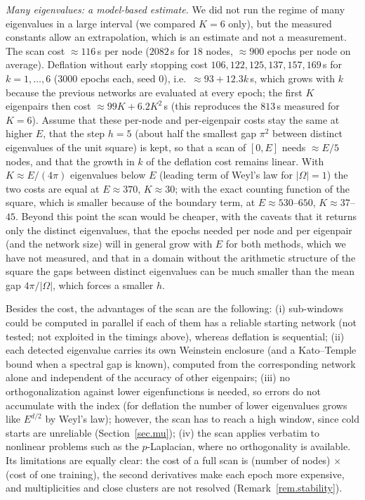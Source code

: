 \documentclass[10pt]{amsart}
\newenvironment{revblock}{\color{blue}}{}
\theoremstyle{definition}
\theoremstyle{remark}
\theoremstyle{plain}
\begin{document}
\begin{revblock}
\emph{Many eigenvalues: a model-based estimate.} We did not run the regime of many eigenvalues in a
large interval (we compared $K=6$ only), but the measured constants allow an extrapolation, which is an
estimate and not a measurement. The scan cost $\approx116$\,s per node ($2082$\,s for 18 nodes,
$\approx900$ epochs per node on average). Deflation without early stopping cost $106,122,125,137,157,169$\,s
for $k=1,\dots,6$ (3000 epochs each, seed 0), i.e.\ $\approx93+12.3k$\,s, which grows with $k$ because
the previous networks are evaluated at every epoch; the first $K$ eigenpairs then cost
$\approx99K+6.2K^2$\,s (this reproduces the $813$\,s measured for $K=6$). Assume that these per-node and
per-eigenpair costs stay the same at higher $E$, that the step $h=5$ (about half the smallest gap
$\pi^2$ between distinct eigenvalues of the unit square) is kept, so that a scan of $[0,E]$ needs
$\approx E/5$ nodes, and that the growth in $k$ of the deflation cost remains linear. With $K\approx
E/(4\pi)$ eigenvalues below $E$ (leading term of Weyl's law for $|\Omega|=1$) the two costs are equal at
$E\approx370$, $K\approx30$; with the exact counting function of the square, which is smaller because of
the boundary term, at $E\approx530$--$650$, $K\approx37$--$45$. Beyond this point the scan would be
cheaper, with the caveats that it returns only the distinct eigenvalues, that the epochs needed per
node and per eigenpair (and the network size) will in general grow with $E$ for both methods, which
we have not measured, and that in a domain without the arithmetic structure of the square the gaps
between distinct eigenvalues can be much smaller than the mean gap $4\pi/|\Omega|$, which forces a
smaller $h$.

Besides the cost, the advantages of the
scan are the following: (i) sub-windows could be computed in parallel if each of them has a reliable
starting network (not tested; not exploited in the timings above), whereas deflation is sequential;
(ii) each detected eigenvalue carries its own Weinstein enclosure (and a Kato--Temple bound when a
spectral gap is known), computed from the corresponding network alone and
independent of the accuracy of other eigenpairs; (iii) no orthogonalization against lower
eigenfunctions is needed, so errors do not accumulate with the index (for deflation the number of
lower eigenvalues grows like $E^{d/2}$ by Weyl's law); however, the scan has to reach a high window,
since cold starts are unreliable (Section~\ref{sec.mu}); (iv) the scan applies verbatim to nonlinear
problems such as the $p$-Laplacian, where no orthogonality is available. Its limitations are equally
clear: the cost of a full scan is (number of nodes) $\times$ (cost of one training), the second
derivatives make each epoch more expensive, and multiplicities and close clusters are not resolved
(Remark~\ref{rem.stability}).
\end{revblock}
\end{document}
